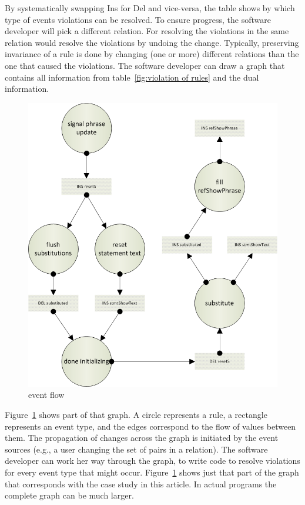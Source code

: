 \documentclass{elsarticle}
\begin{document}
	By systematically swapping Ins for Del and vice-versa,
	the table shows by which type of events violations can be resolved.
	To ensure progress, the software developer will pick a different relation.
	For resolving the violations in the same relation would resolve the violations by undoing the change.
        Typically, preserving invariance of a rule is done by changing (one or more) different relations than the one that caused the violations.
	The software developer can draw a graph that contains all information from table~\ref{fig:violation of rules}
	and the dual information.
\begin{figure}[bht]
\begin{center}
  \includegraphics[scale=.55]{eventFlow.png}
\end{center}
\caption{event flow}
\label{fig:event flow}
\end{figure}
	Figure~\ref{fig:event flow} shows part of that graph.
	A circle represents a rule, a rectangle represents an event type, and the edges correspond to the flow of values between them.
	The propagation of changes across the graph is initiated by the event sources (e.g., a user changing the set of pairs in a relation).
	The software developer can work her way through the graph, to write code to resolve violations for every event type that might occur.
	Figure~\ref{fig:event flow} shows just that part of the graph that corresponds with the case study in this article.
	In actual programs the complete graph can be much larger.
\end{document}
